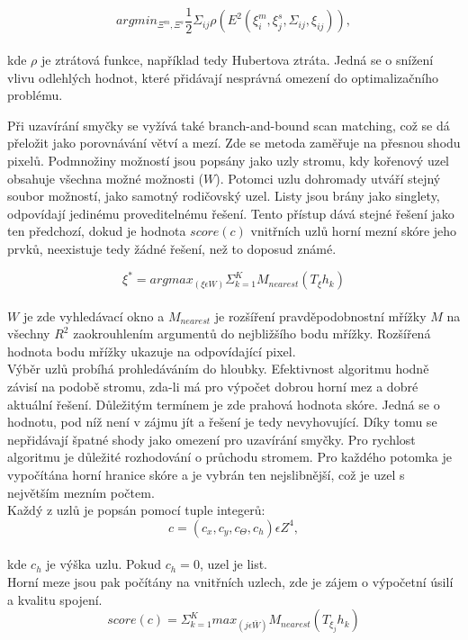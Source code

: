 \documentclass[11pt]{article}
\begin{document}
\begin{equation}
	argmin_{\Xi^m,\Xi^s}\frac{1}{2}\Sigma_{ij}\rho(E^2(\xi_i^m,\xi_j^s,\Sigma_{ij},\xi_{ij})),
\end{equation}\\
kde $\rho$ je ztrátová funkce, například tedy Hubertova ztráta. Jedná se o snížení vlivu odlehlých hodnot, které přidávají nesprávná omezení do optimalizačního problému.

\indent Při uzavírání smyčky se vyžívá také branch-and-bound scan matching, což se dá přeložit jako porovnávání větví a mezí. Zde se metoda zaměřuje na přesnou shodu pixelů. Podmnožiny možností jsou popsány jako uzly stromu, kdy kořenový uzel obsahuje všechna možné možnosti ($W$). Potomci uzlu dohromady utváří stejný soubor možností, jako samotný rodičovský uzel. Listy jsou brány jako singlety, odpovídají jedinému proveditelnému řešení. Tento přístup dává stejné řešení jako ten předchozí, dokud je hodnota $score(c)$ vnitřních uzlů horní mezní skóre jeho prvků, neexistuje tedy žádné řešení, než to doposud známé.

\begin{equation}
	\xi^*=argmax_{(\xi\epsilon W)}\Sigma_{k=1}^KM_{nearest}(T_{\xi}h_k)
\end{equation}\\
$W$ je zde vyhledávací okno a $M_{nearest}$ je rozšíření pravděpodobnostní mřížky $M$ na všechny $R^2$ zaokrouhlením argumentů do nejbližšího bodu mřížky. Rozšířená hodnota bodu mřížky ukazuje na odpovídající pixel.\\
\indent Výběr uzlů probíhá prohledáváním do hloubky. Efektivnost algoritmu hodně závisí na podobě stromu, zda-li má pro výpočet dobrou horní mez a dobré aktuální řešení. Důležitým termínem je zde prahová hodnota skóre. Jedná se o hodnotu, pod níž není v zájmu jít a řešení je tedy nevyhovující. Díky tomu se nepřidávají špatné shody jako omezení pro uzavírání smyčky. Pro rychlost algoritmu je důležité rozhodování o průchodu stromem. Pro každého potomka je vypočítána horní hranice skóre a je vybrán ten nejslibnější, což je uzel s největším mezním počtem.\\
\indent Každý z uzlů je popsán pomocí tuple integerů: 
\begin{equation}
	c=(c_x,c_y,c_\Theta,c_h)\epsilon Z^4,
\end{equation}\\
kde $c_h$ je výška uzlu. Pokud $c_h=0$, uzel je list.\\
\indent Horní meze jsou pak počítány na vnitřních uzlech, zde je zájem o výpočetní úsilí a kvalitu spojení. 
\begin{equation}
	score(c)=\Sigma_{k=1}^Kmax_{(j\epsilon \bar{W})}M_{nearest}(T_{\xi_j}h_k)
\end{equation}
\end{document}
